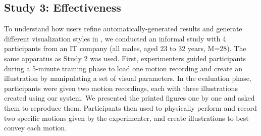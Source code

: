 \subsection{Study 3: \phaseII{} Effectiveness}

To understand how users refine automatically-generated results and generate different visualization styles in \phaseII{}, we conducted an informal study with 4 participants from an IT company (all males, aged 23 to 32 years, M=28).
%
The same apparatus as Study 2 was used.
First, experimenters guided participants during a 5-minute training phase
 to load one motion recording and create an illustration
by manipulating a set of visual parameters. %
%
%
%
In the evaluation phase, participants were given two motion recordings, each with three illustrations created using our system. We presented the printed figures one by one and asked them to reproduce them.
%
Participants then used \systemname{} to physically perform and record two specific motions given by the experimenter,
and create illustrations to best convey each motion.
%

